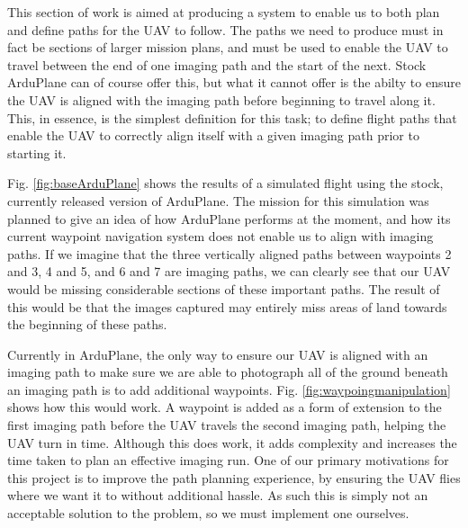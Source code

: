 This section of work is aimed at producing a system to enable us to both plan and define paths for the UAV to follow. The paths we need to produce must in fact be sections of larger mission plans, and must be used to enable the UAV to travel between the end of one imaging path and the start of the next. Stock ArduPlane can of course offer this, but what it cannot offer is the abilty to ensure the UAV is aligned with the imaging path before beginning to travel along it. This, in essence, is the simplest definition for this task; to define flight paths that enable the UAV to correctly align itself with a given imaging path prior to starting it.  

Fig. \ref{fig:baseArduPlane} shows the results of a simulated flight using the stock, currently released version of ArduPlane. The mission for this simulation was planned to give an idea of how ArduPlane performs at the moment, and how its current waypoint navigation system does not enable us to align with imaging paths. If we imagine that the three vertically aligned paths between waypoints 2 and 3, 4 and 5, and 6 and 7 are imaging paths, we can clearly see that our UAV would be missing considerable sections of these important paths. The result of this would be that the images captured may entirely miss areas of land towards the beginning of these paths. 

Currently in ArduPlane, the only way to ensure our UAV is aligned with an imaging path to make sure we are able to photograph all of the ground beneath an imaging path is to add additional waypoints. Fig. \ref{fig:waypoingmanipulation} shows how this would work. A waypoint is added as a form of extension to the first imaging path before the UAV travels the second imaging path, helping the UAV turn in time. Although this does work, it adds complexity and increases the time taken to plan an effective imaging run. One of our primary motivations for this project is to improve the path planning experience, by ensuring the UAV flies where we want it to without additional hassle. As such this is simply not an acceptable solution to the problem, so we must implement one ourselves.

